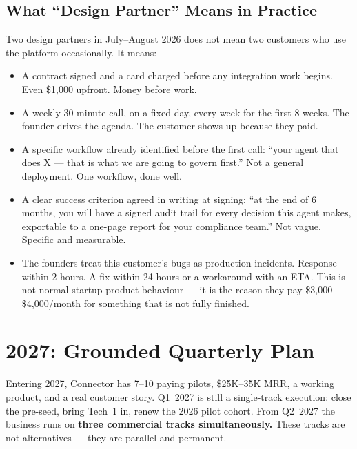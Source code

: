 \subsection*{What ``Design Partner'' Means in Practice}

Two design partners in July--August 2026 does not mean two customers who
use the platform occasionally. It means:

\begin{itemize}[leftmargin=1.5em, itemsep=3pt]
  \item A contract signed and a card charged before any integration work
        begins. Even \$1,000 upfront. Money before work.
  \item A weekly 30-minute call, on a fixed day, every week for the
        first 8 weeks. The founder drives the agenda. The customer shows
        up because they paid.
  \item A specific workflow already identified before the first call:
        ``your agent that does X --- that is what we are going to
        govern first.'' Not a general deployment. One workflow, done well.
  \item A clear success criterion agreed in writing at signing:
        ``at the end of 6 months, you will have a signed audit trail for
        every decision this agent makes, exportable to a one-page report
        for your compliance team.'' Not vague. Specific and measurable.
  \item The founders treat this customer's bugs as production incidents.
        Response within 2 hours. A fix within 24 hours or a workaround
        with an ETA. This is not normal startup product behaviour --- it
        is the reason they pay \$3,000--\$4,000/month for something that
        is not fully finished.
\end{itemize}

\section*{2027: Grounded Quarterly Plan}

Entering 2027, Connector has 7--10 paying pilots, \$25K--35K MRR, a
working product, and a real customer story. Q1~2027 is still a
single-track execution: close the pre-seed, bring Tech~1 in, renew the
2026 pilot cohort. From Q2~2027 the business runs on \textbf{three
commercial tracks simultaneously.} These tracks are not alternatives ---
they are parallel and permanent.

